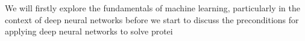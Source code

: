 We will firstly explore the fundamentals of machine learning, particularly in the context of deep neural networks before we start to discuss the preconditions for applying deep neural networks to solve protei